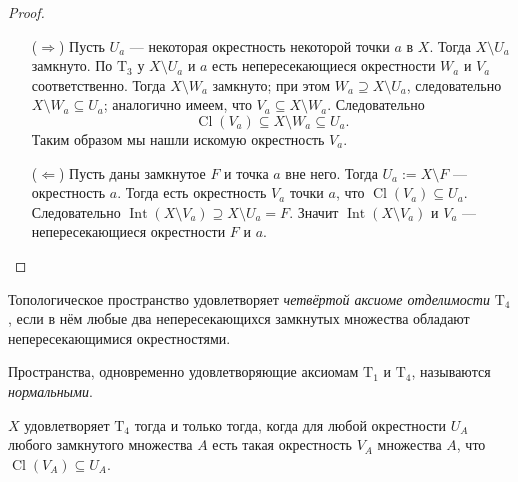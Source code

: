 \documentclass[12pt,a4paper]{article}
\DeclareMathOperator{\Int}{Int}
\DeclareMathOperator{\Cl}{Cl}
\newcommand{\T}{\ensuremath{\mathrm{T}}\xspace}
\begin{document}
    \begin{proof}
        \begin{itemize}
            \item[($\Rightarrow$)]
                Пусть $U_a$ --- некоторая окрестность некоторой точки $a$ в $X$. Тогда $X \setminus U_a$ замкнуто. По $\T_3$ у $X \setminus U_a$ и $a$ есть непересекающиеся окрестности $W_a$ и $V_a$ соответственно. Тогда $X \setminus W_a$ замкнуто; при этом $W_a \supseteq X \setminus U_a$, следовательно $X \setminus W_a \subseteq U_a$; аналогично имеем, что $V_a \subseteq X \setminus W_a$. Следовательно
                \[\Cl(V_a) \subseteq X \setminus W_a \subseteq U_a.\]
                Таким образом мы нашли искомую окрестность $V_a$.

            \item[($\Leftarrow$)]
                Пусть даны замкнутое $F$ и точка $a$ вне него. Тогда $U_a := X \setminus F$ --- окрестность $a$. Тогда есть окрестность $V_a$ точки $a$, что $\Cl(V_a) \subseteq U_a$. Следовательно $\Int(X \setminus V_a) \supseteq X \setminus U_a = F$. Значит $\Int(X \setminus V_a)$ и $V_a$ --- непересекающиеся окрестности $F$ и $a$.
        \end{itemize}
    \end{proof}

    \begin{definition}
        Топологическое пространство удовлетворяет \emph{четвёртой аксиоме отделимости} $\T_4$, если в нём любые два непересекающихся замкнутых множества обладают непересекающимися окрестностями.

        Пространства, одновременно удовлетворяющие аксиомам $\T_1$ и $\T_4$, называются \emph{нормальными}.
    \end{definition}

    \begin{theorem}
        $X$ удовлетворяет $\T_4$ тогда и только тогда, когда для любой окрестности $U_A$ любого замкнутого множества $A$ есть такая окрестность $V_A$ множества $A$, что $\Cl(V_A) \subseteq U_A$.
    \end{theorem}
\end{document}

